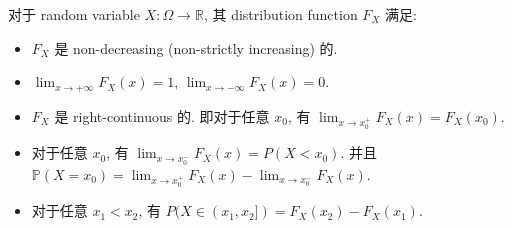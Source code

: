 \begin{theorem}{}\label{thm-02-random-variables-distribution-function}

对于 random variable \(\mathit{X}:\Omega\rightarrow\mathbb{R}\), 其 distribution function \(\mathit{F}_{\mathit{X}}\) 满足:

\begin{itemize}
\item
  \(\mathit{F}_{\mathit{X}}\) 是 non-decreasing (non-strictly increasing) 的.
\item
  \(\lim_{\mathit{x}\rightarrow + \infty}\mathit{F}_{\mathit{X}}(\mathit{x}) = 1\), \(\lim_{\mathit{x}\rightarrow - \infty}\mathit{F}_{\mathit{X}}(\mathit{x}) = 0\).
\item
  \(\mathit{F}_{\mathit{X}}\) 是 right-continuous 的. 即对于任意 \(\mathit{x}_{0}\), 有 \(\lim_{\mathit{x}\rightarrow\mathit{x}_{0}^{+}}\mathit{F}_{\mathit{X}}(\mathit{x}) = \mathit{F}_{\mathit{X}}(\mathit{x}_{0})\).
\item
  对于任意 \(\mathit{x}_{0}\), 有 \(\lim_{\mathit{x}\rightarrow\mathit{x}_{0}^{-}}\mathit{F}_{\mathit{X}}(\mathit{x}) = \mathit{P}(\mathit{X} < \mathit{x}_{0})\). 并且 \(\mathbb{P}(\mathit{X} = \mathit{x}_{0}) = \lim_{\mathit{x}\rightarrow\mathit{x}_{0}^{+}}\mathit{F}_{\mathit{X}}(\mathit{x}) - \lim_{\mathit{x}\rightarrow\mathit{x}_{0}^{-}}\mathit{F}_{\mathit{X}}(\mathit{x})\).
\item
  对于任意 \(\mathit{x}_{1} < \mathit{x}_{2}\), 有 \(\mathit{P}(\mathit{X} \in (\mathit{x}_{1},\mathit{x}_{2}\rbrack) = \mathit{F}_{\mathit{X}}(\mathit{x}_{2}) - \mathit{F}_{\mathit{X}}(\mathit{x}_{1})\).
\end{itemize}

\end{theorem}

